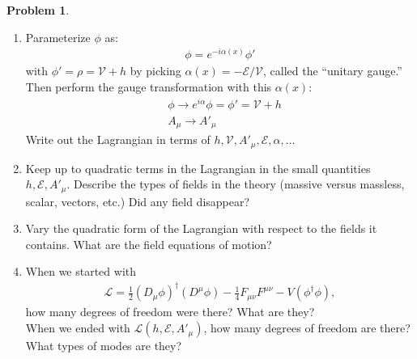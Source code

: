 \documentclass[a4paper,11pt]{article}
\numberwithin{equation}{section}
\theoremstyle{definition}
\newtheorem{prob}{Problem}[section]
\newcommand{\lag}{\mathcal{L}}
\begin{document}
\begin{prob}
\begin{enumerate}
		
		\item Parameterize $\phi$ as:
		\begin{align}
		\phi = e^{-i\alpha(x)}\phi'
		\end{align}
		with $\phi' = \rho = \mathcal{V} + h$ by picking $\alpha(x) = -\mathcal{E}/\mathcal{V}$, called the ``unitary gauge.'' Then perform the gauge transformation with this $\alpha(x)$:
		\begin{align}
		&\phi \to e^{i\alpha}\phi = \phi' = \mathcal{V}+ h\\
		&A_\mu \to A'_\mu
		\end{align}
		Write out the Lagrangian in terms of $h,\mathcal{V}, A'_\mu, \mathcal{E}, \alpha,\dots$\\
		
		
		
		
		\item Keep up to quadratic terms in the Lagrangian in the small quantities $h,\mathcal{E}, A'_\mu$. Describe the types of fields in the theory (massive versus massless, scalar, vectors, etc.) Did any field disappear?\\
		
		
		\item Vary the quadratic form of the Lagrangian with respect to the fields it contains. What are the field equations of motion?\\
		
		
		\item When we started with 
		\begin{align}
		\lag = \frac{1}{2}(D_\mu\phi)^\dagger(D^\mu\phi) - \frac{1}{4}F_{\mu\nu}F^{\mu\nu} - V(\phi^\dagger\phi),
		\end{align}
		how many degrees of freedom were there? What are they?\\
		
		When we ended with $\lag(h,\mathcal{E}, A'_\mu)$, how many degrees of freedom are there? What types of modes are they?\\
		
	\end{enumerate}


\end{prob}
\end{document}
